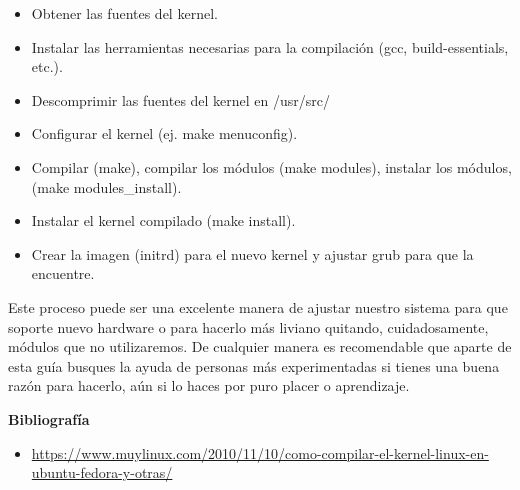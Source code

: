 \documentclass[11pt, a4paper]{report}
\begin{document}
\begin{itemize}
\item Obtener las fuentes del kernel.
\item Instalar las herramientas necesarias para la compilación (gcc,
  build-essentials, etc.).
\item Descomprimir las fuentes del kernel en /usr/src/
\item Configurar el kernel (ej. make menuconfig).
\item Compilar (make), compilar los módulos (make modules), instalar los
  módulos, (make modules\_install).
\item Instalar el kernel compilado (make install).
\item Crear la imagen (initrd) para el nuevo kernel y ajustar grub para que la
  encuentre.
\end{itemize}

Este proceso puede ser una excelente manera de ajustar nuestro sistema para que
soporte nuevo hardware o para hacerlo más liviano quitando, cuidadosamente,
módulos que no utilizaremos. De cualquier manera es recomendable que aparte de
esta guía busques la ayuda de personas más experimentadas si tienes una buena
razón para hacerlo, aún si lo haces por puro placer o aprendizaje.

\newpage

\textbf{Bibliografía} \\

\begin{itemize}

\item \url{https://www.muylinux.com/2010/11/10/como-compilar-el-kernel-linux-en-ubuntu-fedora-y-otras/}


\end{itemize}
\end{document}
